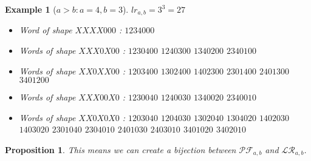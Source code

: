 \documentclass[12pt]{report}
\newtheorem*{prop}{Proposition}
\newtheorem*{example}{Example}
\begin{document}
\begin{example}[$a > b : a = 4, b = 3$]
    $lr_{a,b} = 3^3 = 27$
    \begin{itemize}
        \item Word of shape $XXXX000$ :
            \subitem $1234000$
        \item Words of shape $XXX0X00$ :
            \subitem $1230400$
            \hspace{2cm} $1240300$
            \hspace{2cm} $1340200$
            \subitem $2340100$
        \item Words of shape $XX0XX00$ :
            \subitem $1203400$
            \hspace{2cm} $1302400$
            \hspace{2cm} $1402300$
            \subitem $2301400$
            \hspace{2cm} $2401300$
            \hspace{2cm} $3401200$
        \item Words of shape $XXX00X0$ :
            \subitem $1230040$
            \hspace{2cm} $1240030$
            \hspace{2cm} $1340020$
            \subitem $2340010$
        \item Words of shape $XX0X0X0$ :
            \subitem $1203040$
            \hspace{2cm} $1204030$
            \hspace{2cm} $1302040$
            \subitem $1304020$
            \hspace{2cm} $1402030$
            \hspace{2cm} $1403020$
            \subitem $2301040$
            \hspace{2cm} $2304010$
            \hspace{2cm} $2401030$
            \subitem $2403010$
            \hspace{2cm} $3401020$
            \hspace{2cm} $3402010$
    \end{itemize}
    
\end{example}

\begin{prop}
    This means we can create a \emph{bijection} between
    $\mathcal{PF}_{a,b}$ and $\mathcal{LR}_{a,b}$.
\end{prop}
\end{document}
